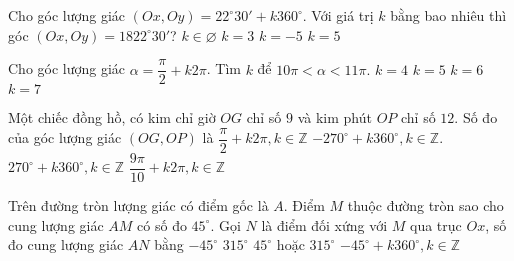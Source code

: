 \begin{ex}%
Cho góc lượng giác $\left(Ox,Oy\right)=22^{\circ}30'+k360^{\circ}.$ Với giá trị $k$ bằng bao nhiêu thì góc $\left(Ox,Oy\right)=1822^{\circ}30'$? 
\choice
{$k\in \varnothing$}
{$k=3$}
{$k=-5$}
{\True $k=5$}
\end{ex}

\begin{ex}%
Cho góc lượng giác $\alpha =\dfrac{\pi}{2}+k2\pi $. Tìm $k$ để $10\pi <\alpha <11\pi.$
\choice
{$k=4$}
{\True $k=5$}
{$k=6$}
{$k=7$}
\end{ex}

\begin{ex}%
Một chiếc đồng hồ, có kim chỉ giờ $OG$ chỉ số $9$ và kim phút $OP$ chỉ số $12$. Số đo của góc lượng giác $\left(OG,OP\right)$ là
\choice
{\True $\dfrac{\pi}{2}+k2\pi,k\in \mathbb{Z}$}
{$-270^{\circ}+k360^{\circ},k\in \mathbb{Z}.$}
{$270^{\circ}+k360^{\circ},k\in \mathbb{Z}$}
{$\dfrac{9\pi}{10}+k2\pi,k\in \mathbb{Z}$}
\end{ex}

\begin{ex}%
Trên đường tròn lượng giác có điểm gốc là $A$. Điểm $M$ thuộc đường tròn sao cho cung lượng giác $AM$ có số đo $45^{\circ}$. Gọi $N$ là điểm đối xứng với $M$ qua trục $Ox$, số đo cung lượng giác $AN$ bằng
\choice
{$-45^{\circ}$}
{$315^{\circ}$}
{$45^{\circ}$ hoặc $315^{\circ}$}
{\True $-45^{\circ}+k360^{\circ},k\in \mathbb{Z}$}
\end{ex}

